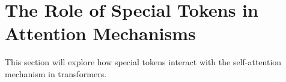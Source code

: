 \section{The Role of Special Tokens in Attention Mechanisms}
This section will explore how special tokens interact with the self-attention mechanism in transformers.